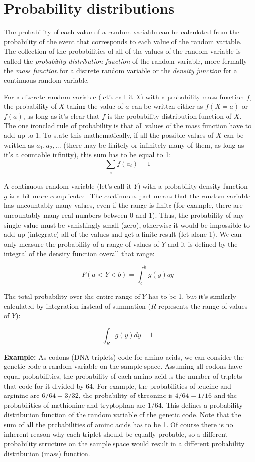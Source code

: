 \documentclass[
  letterpaper,
  DIV=11,
  numbers=noendperiod]{scrreprt}
\begin{document}
\section{Probability distributions}\label{probability-distributions}

The probability of each value of a random variable can be calculated
from the probability of the event that corresponds to each value of the
random variable. The collection of the probabilities of all of the
values of the random variable is called the \emph{probability
distribution function} of the random variable, more formally the
\emph{mass function} for a discrete random variable or the \emph{density
function} for a continuous random variable.

For a discrete random variable (let's call it \(X\)) with a probability
mass function \(f\), the probability of \(X\) taking the value of \(a\)
can be written either as \(f(X=a)\) or \(f(a)\), as long as it's clear
that \(f\) is the probability distribution function of \(X\). The one
ironclad rule of probability is that all values of the mass function
have to add up to 1. To state this mathematically, if all the possible
values of \(X\) can be written as \(a_1, a_2, ...\) (there may be
finitely or infinitely many of them, as long as it's a countable
infinity), this sum has to be equal to 1: \[ \sum_i f(a_i) = 1 \]

A continuous random variable (let's call it \(Y\)) with a probability
density function \(g\) is a bit more complicated. The continuous part
means that the random variable has uncountably many values, even if the
range is finite (for example, there are uncountably many real numbers
between 0 and 1). Thus, the probability of any single value must be
vanishingly small (zero), otherwise it would be impossible to add up
(integrate) all of the values and get a finite result (let alone 1). We
can only measure the probability of a range of values of \(Y\) and it is
defined by the integral of the density function overall that range:

\[ P( a< Y < b) = \int_a ^b g(y) dy \]

The total probability over the entire range of \(Y\) has to be 1, but
it's similarly calculated by integration instead of summation (\(R\)
represents the range of values of \(Y\)):

\[ \int_R g(y) dy = 1\]

\textbf{Example:} As codons (DNA triplets) code for amino acids, we can
consider the genetic code a random variable on the sample space.
Assuming all codons have equal probabilities, the probability of each
amino acid is the number of triplets that code for it divided by 64. For
example, the probabilities of leucine and arginine are \(6/64 = 3/32\),
the probability of threonine is \(4/64 = 1/16\) and the probabilities of
methionine and tryptophan are \(1/64\). This defines a probability
distribution function of the random variable of the genetic code. Note
that the sum of all the probabilities of amino acids has to be 1. Of
course there is no inherent reason why each triplet should be equally
probable, so a different probability structure on the sample space would
result in a different probability distribution (mass) function.
\end{document}
